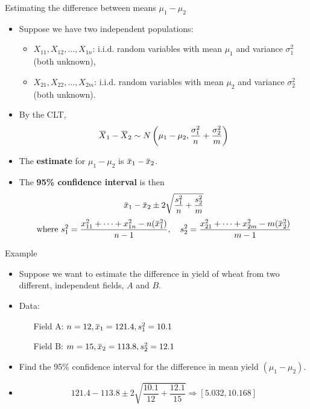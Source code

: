 \documentclass[10pt, handout, xcolor=table]{beamer}
\newcommand*\themecol{\usebeamercolor[fg]{structure}}
\newcommand{\overbar}[1]{\mkern 1.5mu\overline{\mkern-1.5mu#1\mkern-1.5mu}\mkern 1.5mu}
\begin{document}
\begin{frame}{Estimating the difference between means $\mu_1 - \mu_2$}
\begin{itemize}
\setlength{\itemsep}{10pt}
\item Suppose we have two independent populations:
\begin{itemize}
\vspace*{6pt}
\setlength{\itemsep}{6pt}
\item $X_{11}, X_{12},\dots, X_{1n}$: i.i.d. random variables with mean $\mu_1$ and variance $\sigma_1^2$ (both unknown), 
\item $X_{21}, X_{22}, \dots, X_{2m}$: i.i.d. random variables with mean $\mu_2$ and variance $\sigma_2^2$ (both unknown).
\end{itemize}
\item By the CLT, {\small
\[
\overbar{X}_1 - \overbar{X}_2 \sim N\left(\mu_1 - \mu_2, \frac{\sigma_1^2}{n} + \frac{\sigma_2^2}{m}\right)
\]
}
\item The \textbf{estimate} for $\mu_1 - \mu_2$ is {\themecol $\overbar{x}_1 - \overbar{x}_2$}.
\item The \textbf{95\% confidence interval} is then
\begin{align*}
\overbar{x}_1 - \overbar{x}_2 \pm 2 \sqrt{\frac{s_1^2}{n} + \frac{s_2^2}{m}}
\end{align*}
{\footnotesize
$$ \text{where } s_1^2 = \frac{x_{11}^2 + \cdots + x_{1n}^2 - n(\overbar{x}_1^2)}{n-1}, \quad s_2^2 = \frac{x_{21}^2 + \cdots + x_{2m}^2 - m(\overbar{x}_2^2)}{m-1}$$}
\end{itemize}
\end{frame}

\begin{frame}{Example}
\begin{itemize}
\setlength{\itemsep}{15pt}
\item Suppose we want to estimate the difference in yield of wheat from two different, independent fields, $A$ and $B$. 
\item Data:

\hspace{1cm}
\begin{itemize}
\setlength{\itemsep}{8pt}
\item[Field A:] $n = 12, \overbar{x}_1 = 121.4, s_1^2 = 10.1$
\item[Field B:] $m = 15, \overbar{x}_2 = 113.8, s_2^2 = 12.1$
\end{itemize}
\item Find the 95\% confidence interval for the difference in mean yield $(\mu_1 - \mu_2)$. 
\item<2->[A:] {\color{red} 
$$121.4 - 113.8 \pm 2 \sqrt{\frac{10.1}{12} + \frac{12.1}{15}} \Rightarrow [5.032, 10.168]$$
} 
\end{itemize}
\end{frame}
\end{document}
